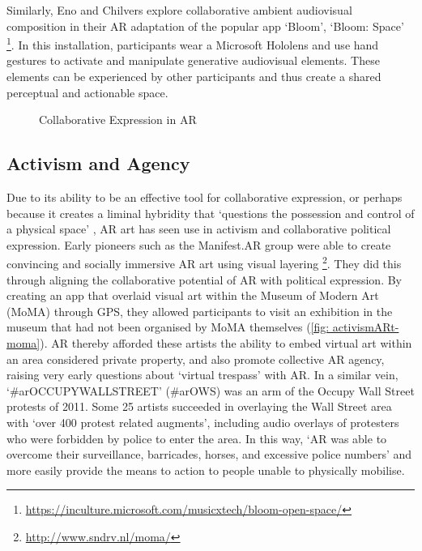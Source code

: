 Similarly, Eno and Chilvers explore collaborative ambient audiovisual composition in their AR adaptation of the popular app `Bloom', `Bloom: Space' \footnote{\url{https://inculture.microsoft.com/musicxtech/bloom-open-space/}}. In this installation, participants wear a Microsoft Hololens and use hand gestures to activate and manipulate generative audiovisual elements. These elements can be experienced by other participants and thus create a shared perceptual and actionable space.

\begin{figure}
    \centering
    \hfill
    \caption{Collaborative Expression in AR}
    \label{fig: collaborativeARt}
\end{figure}

\subsection{Activism and Agency}\label{sec: ar-arts-activism}
Due to its ability to be an effective tool for collaborative expression, or perhaps because it creates a liminal hybridity that `questions the possession and control of a physical space' \citep{thiel2018}, AR art has seen use in activism and collaborative political expression. Early pioneers such as the Manifest.AR group were able to create convincing and socially immersive AR art using visual layering \footnote{\url{http://www.sndrv.nl/moma/}}. They did this through aligning the collaborative potential of AR with political expression. By creating an app that overlaid visual art within the Museum of Modern Art (MoMA) through GPS, they allowed participants to visit an exhibition in the museum that had not been organised by MoMA themselves (\autoref{fig: activismARt-moma}). AR thereby afforded these artists the ability to embed virtual art within an area considered private property, and also promote collective AR agency, raising very early questions about `virtual trespass' with AR. In a similar vein, `\#arOCCUPYWALLSTREET' (\#arOWS) was an arm of the Occupy Wall Street protests of 2011. Some 25 artists succeeded in overlaying the Wall Street area with `over 400 protest related augments', including audio overlays of protesters who were forbidden by police to enter the area. In this way, `AR was able to overcome their surveillance, barricades, horses, and excessive police numbers' \citeyearpar{skwarek2018} and more easily provide the means to action to people unable to physically mobilise.


